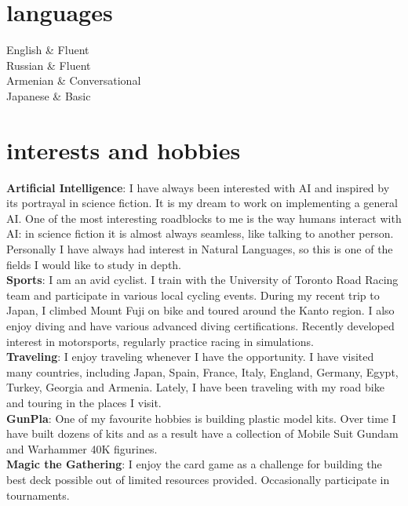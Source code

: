 \documentclass[]{cv-roald}
\begin{document}
\section*{languages}
\begin{tabularcv}
    English			&	Fluent \\[\vspacepar]
    Russian			&	Fluent \\[\vspacepar]
    Armenian		&	Conversational \\[\vspacepar]
    Japanese        &   Basic
\end{tabularcv}

\section*{interests and hobbies}
\textbf{Artificial Intelligence}: I have always been interested with AI and inspired by its portrayal in science fiction. It is my dream to work on implementing a general AI. One of the most interesting roadblocks to me is the way humans interact with AI: in science fiction it is almost always seamless, like talking to another person. Personally I have always had interest in Natural Languages, so this is one of the fields I would like to study in depth.\\
\textbf{Sports}: I am an avid cyclist. I train with the University of Toronto Road Racing team and participate in various local cycling events. During my recent trip to Japan, I climbed Mount Fuji on bike and toured around the Kanto region.
I also enjoy diving and have various advanced diving certifications. Recently developed interest in motorsports, regularly practice racing in simulations.\\
\textbf{Traveling}: I enjoy traveling whenever I have the opportunity. I have visited many countries, including Japan, Spain, France, Italy, England, Germany, Egypt, Turkey, Georgia and Armenia. Lately, I have been traveling with my road bike and touring in the places I visit.\\
\textbf{GunPla}: One of my favourite hobbies is building plastic model kits. Over time I have built dozens of kits and as a result have a collection of Mobile Suit Gundam and Warhammer 40K figurines.\\
\textbf{Magic the Gathering}: I enjoy the card game as a challenge for building the best deck possible out of limited resources provided. Occasionally participate in tournaments.\\
\end{document}
